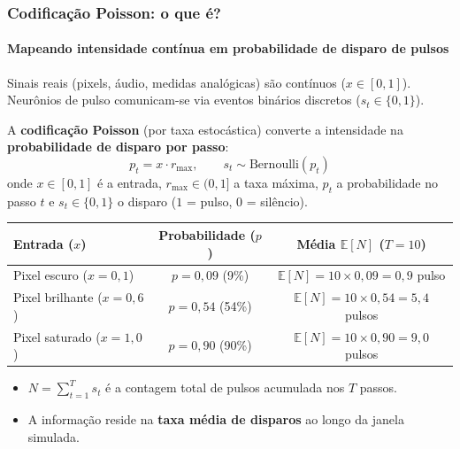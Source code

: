 \begin{frame}
	\frametitle{Codificação Poisson: o que é?}
	\framesubtitle{Mapeando intensidade contínua em probabilidade de disparo de pulsos}
	\small
	\par Sinais reais (pixels, áudio, medidas analógicas) são contínuos ($x \in [0, 1]$). Neurônios de pulso comunicam-se via eventos binários discretos ($s_t \in \{0, 1\}$).
	\par A \textbf{codificação Poisson} (por taxa estocástica) converte a intensidade na \textbf{probabilidade de disparo por passo}:
	\[
		p_t = x \cdot r_{\max}, \qquad s_t \sim \mathrm{Bernoulli}(p_t)
	\]
	onde $x \in [0,1]$ é a entrada, $r_{\max} \in (0,1]$ a taxa máxima, $p_t$ a probabilidade no passo $t$ e $s_t \in \{0,1\}$ o disparo ($1$ = pulso, $0$ = silêncio).
	\begin{center}
		\footnotesize
		\begin{tabular}{lcc}
			\toprule
			\textbf{Entrada ($x$)} & \textbf{Probabilidade ($p$)} & \textbf{Média $\mathbb{E}[N]$ ($T=10$)} \\
			\midrule
			Pixel escuro ($x = 0{,}1$) & $p = 0{,}09$ (9\%) & $\mathbb{E}[N] = 10 \times 0{,}09 = 0{,}9$ pulso \\
			Pixel brilhante ($x = 0{,}6$) & $p = 0{,}54$ (54\%) & $\mathbb{E}[N] = 10 \times 0{,}54 = 5{,}4$ pulsos \\
			Pixel saturado ($x = 1{,}0$) & $p = 0{,}90$ (90\%) & $\mathbb{E}[N] = 10 \times 0{,}90 = 9{,}0$ pulsos \\
			\bottomrule
		\end{tabular}
	\end{center}
	\begin{itemize}
		\setlength{\itemsep}{1pt}
		\item $N = \sum_{t=1}^T s_t$ é a contagem total de pulsos acumulada nos $T$ passos.
		\item A informação reside na \textbf{taxa média de disparos} ao longo da janela simulada.
	\end{itemize}
\end{frame}

